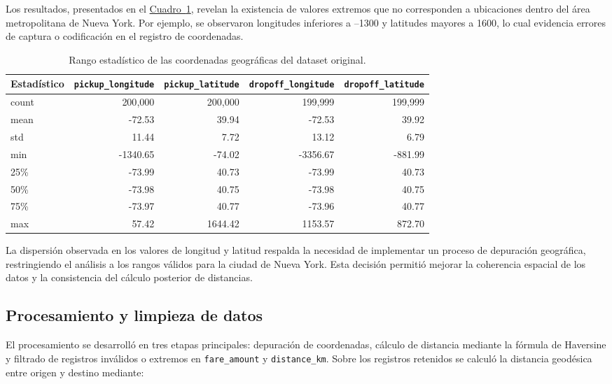 \documentclass[10pt]{article}
\newcommand{\cuadroref}[1]{\hyperref[#1]{Cuadro~\ref*{#1}}}
\begin{document}
	Los resultados, presentados en el \cuadroref{tab:rango_coordenadas}, revelan la existencia de valores extremos que no corresponden a ubicaciones dentro del área metropolitana de Nueva York. Por ejemplo, se observaron longitudes inferiores a --1300 y latitudes mayores a 1600, lo cual evidencia errores de captura o codificación en el registro de coordenadas.

	\begin{table}[!htbp]
		\centering
		\caption{Rango estadístico de las coordenadas geográficas del dataset original.}
		\label{tab:rango_coordenadas}
		\begin{adjustbox}{max width=0.95\textwidth,center}
			\begin{tabular}{lrrrr}
				\hline
				\textbf{Estadístico} & \texttt{pickup\_longitude} & \texttt{pickup\_latitude} & \texttt{dropoff\_longitude} & \texttt{dropoff\_latitude} \\
				\hline
				count & 200{,}000 & 200{,}000 & 199{,}999 & 199{,}999 \\
				mean & -72.53 & 39.94 & -72.53 & 39.92 \\
				std & 11.44 & 7.72 & 13.12 & 6.79 \\
				min & -1340.65 & -74.02 & -3356.67 & -881.99 \\
				25\% & -73.99 & 40.73 & -73.99 & 40.73 \\
				50\% & -73.98 & 40.75 & -73.98 & 40.75 \\
				75\% & -73.97 & 40.77 & -73.96 & 40.77 \\
				max & 57.42 & 1644.42 & 1153.57 & 872.70 \\
				\hline
			\end{tabular}
		\end{adjustbox}
	\end{table}

	La dispersión observada en los valores de longitud y latitud respalda la necesidad de implementar un proceso de depuración geográfica, restringiendo el análisis a los rangos válidos para la ciudad de Nueva York. Esta decisión permitió mejorar la coherencia espacial de los datos y la consistencia del cálculo posterior de distancias.

	\subsection{Procesamiento y limpieza de datos}

	El procesamiento se desarrolló en tres etapas principales: depuración de coordenadas, cálculo de distancia mediante la fórmula de Haversine y filtrado de registros inválidos o extremos en \texttt{fare\_amount} y \texttt{distance\_km}. Sobre los registros retenidos se calculó la distancia geodésica entre origen y destino mediante:
\end{document}
